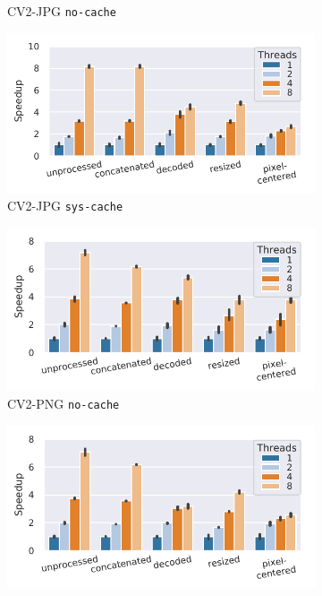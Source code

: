 {\begin{figure}
\begin{subfigure}[c]{0.22\textwidth}
        \vspace{-18pt}
        \caption{CV2-JPG \texttt{no-cache}}
        \label{fig:speedup-cv2-jpg}
    \end{subfigure}
    \begin{subfigure}[c]{0.22\textwidth}
        \includegraphics[width=\textwidth]{figures/cubeplusplus-jpg-pipeline/speedup-4890-samples-epoch-1.pdf}
        \vspace{-18pt}
        \caption{CV2-JPG \texttt{sys-cache}}
        \label{fig:fig:speedup-epochs-cv2-jpg}
    \end{subfigure}
    \begin{subfigure}[c]{0.22\textwidth}
        \includegraphics[width=\textwidth]{figures/cubeplusplus-png-pipeline/speedup-4890-samples-epoch-0.pdf}
        \vspace{-18pt}
        \caption{CV2-PNG \texttt{no-cache}}
        \label{fig:speedup-cv2-png}
    \end{subfigure}
    \begin{subfigure}[c]{0.22\textwidth}
        \includegraphics[width=\textwidth]{figures/cubeplusplus-png-pipeline/speedup-4890-samples-epoch-1.pdf}

\end{subfigure}
\end{figure}}
